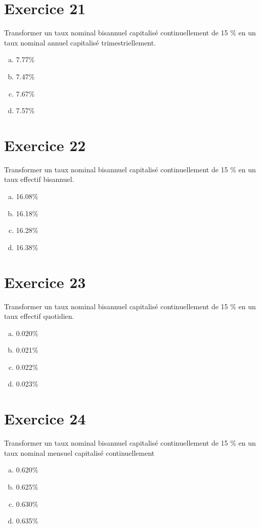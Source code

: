 \documentclass[10pt,a4paper]{article}
\begin{document}
\section*{Exercice 21}
Transformer un taux nominal bisannuel capitalisé continuellement de 15 \% en un taux nominal annuel capitalisé trimestriellement.



\begin{enumerate}[a)]
\item 7.77\%
\item 7.47\%
\item 7.67\%
\item 7.57\%
\end{enumerate}

\section*{Exercice 22}
Transformer un taux nominal bisannuel capitalisé continuellement de 15 \% en un taux effectif bisannuel.



\begin{enumerate}[a)]
\item 16.08\%
\item 16.18\%
\item 16.28\%
\item 16.38\%
\end{enumerate}

\section*{Exercice 23}
Transformer un taux nominal bisannuel capitalisé continuellement de 15 \% en un taux effectif quotidien.



\begin{enumerate}[a)]
\item 0.020\%
\item 0.021\%
\item 0.022\%
\item 0.023\%
\end{enumerate}


\section*{Exercice 24}
Transformer un taux nominal bisannuel capitalisé continuellement de 15 \% en un taux nominal mensuel capitalisé continuellement



\begin{enumerate}[a)]
\item 0.620\%
\item 0.625\%
\item 0.630\%
\item 0.635\%
\end{enumerate}
\end{document}
